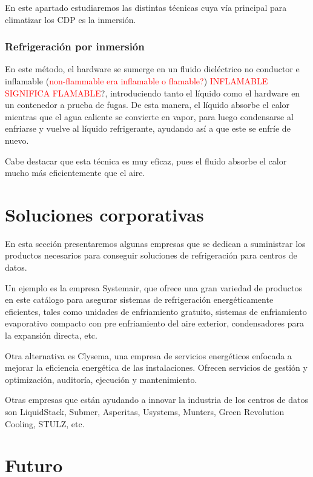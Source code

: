 En este apartado estudiaremos las distintas técnicas cuya vía principal para climatizar los CDP es la inmersión.

\subsubsection{Refrigeración por inmersión}

En este método, el hardware se sumerge en un fluido dieléctrico no conductor e inflamable (\textcolor{red}{non-flammable era inflamable o flamable?}) \textcolor{red}{INFLAMABLE SIGNIFICA FLAMABLE}?, introduciendo tanto el líquido como el hardware en un contenedor a prueba de fugas. De esta manera, el líquido absorbe el calor mientras que el agua caliente se convierte en vapor, para luego condensarse al enfriarse y vuelve al líquido refrigerante, ayudando así a que este se enfríe de nuevo.

Cabe destacar que esta técnica es muy eficaz, pues el fluido absorbe el calor mucho más eficientemente que el aire.

\section{Soluciones corporativas}


En esta sección presentaremos algunas empresas que se dedican a suministrar los productos necesarios para conseguir soluciones de refrigeración para centros de datos.

Un ejemplo es la empresa Systemair, que ofrece una gran variedad de productos en este catálogo para asegurar sistemas de refrigeración energéticamente eficientes, tales como unidades de enfriamiento gratuito, sistemas de enfriamiento evaporativo compacto con pre enfriamiento del aire exterior, condensadores para la expansión directa, etc.

Otra alternativa es Clysema, una empresa de servicios energéticos enfocada a mejorar la eficiencia energética de las instalaciones. Ofrecen servicios de gestión y optimización, auditoría, ejecución y mantenimiento.

Otras empresas que están ayudando a innovar la industria de los centros de datos son LiquidStack, Submer, Asperitas, Usystems, Munters, Green Revolution Cooling, STULZ, etc.



\section{Futuro}

